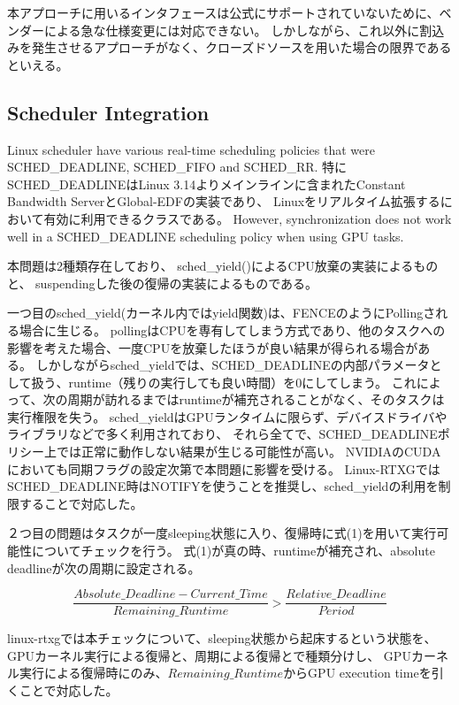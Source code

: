 本アプローチに用いるインタフェースは公式にサポートされていないために、ベンダーによる急な仕様変更には対応できない。
しかしながら、これ以外に割込みを発生させるアプローチがなく、クローズドソースを用いた場合の限界であるといえる。

\subsection{Scheduler Integration}
Linux scheduler have various real-time scheduling policies that were SCHED\_DEADLINE, SCHED\_FIFO and SCHED\_RR.
特にSCHED\_DEADLINEはLinux 3.14よりメインラインに含まれたConstant Bandwidth ServerとGlobal-EDFの実装であり、
Linuxをリアルタイム拡張するにおいて有効に利用できるクラスである。
However, synchronization does not work well in a SCHED\_DEADLINE scheduling policy when using GPU tasks.

本問題は2種類存在しており、
sched\_yield()によるCPU放棄の実装によるものと、
suspendingした後の復帰の実装によるものである。

一つ目のsched\_yield(カーネル内ではyield関数)は、FENCEのようにPollingされる場合に生じる。
pollingはCPUを専有してしまう方式であり、他のタスクへの影響を考えた場合、一度CPUを放棄したほうが良い結果が得られる場合がある。
しかしながらsched\_yieldでは、SCHED\_DEADLINEの内部パラメータとして扱う、runtime（残りの実行しても良い時間）を0にしてしまう。
これによって、次の周期が訪れるまではruntimeが補充されることがなく、そのタスクは実行権限を失う。
sched\_yieldはGPUランタイムに限らず、デバイスドライバやライブラリなどで多く利用されており、
それら全てで、SCHED\_DEADLINEポリシー上では正常に動作しない結果が生じる可能性が高い。
NVIDIAのCUDAにおいても同期フラグの設定次第で本問題に影響を受ける。
Linux-RTXGではSCHED\_DEADLINE時はNOTIFYを使うことを推奨し、sched\_yieldの利用を制限することで対応した。

２つ目の問題はタスクが一度sleeping状態に入り、復帰時に式(1)を用いて実行可能性についてチェックを行う。
式(1)が真の時、runtimeが補充され、absolute deadlineが次の周期に設定される。

{\scriptsize
\begin{equation}
\frac{Absolute\_Deadline - Current\_Time}{Remaining\_Runtime} > \frac{Relative\_Deadline}{Period}
\end{equation}
}

linux-rtxgでは本チェックについて、sleeping状態から起床するという状態を、
GPUカーネル実行による復帰と、周期による復帰とで種類分けし、
GPUカーネル実行による復帰時にのみ、$Remaining\_Runtime$からGPU execution timeを引くことで対応した。

